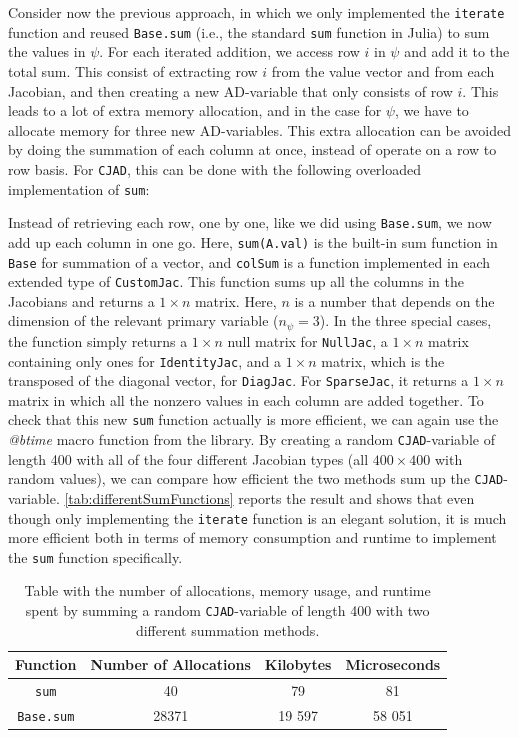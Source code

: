 Consider now the previous approach, in which we only implemented the \texttt{iterate} function and reused \texttt{Base.sum} (i.e., the standard \texttt{sum} function in Julia) to sum the values in $\psi$. For each iterated addition, we access row $i$ in $\psi$ and add it to the total sum. This consist of extracting row $i$ from the value vector and from each Jacobian, and then creating a new AD-variable that only consists of row $i$. This leads to a lot of extra memory allocation, and in the case for $\psi$, we have to allocate memory for three new AD-variables. This extra allocation can be avoided by doing the summation of each column at once, instead of operate on a row to row basis. For \texttt{CJAD}, this can be done with the following overloaded implementation of \texttt{sum}:

Instead of retrieving each row, one by one, like we did using \texttt{Base.sum}, we now add up each column in one go. Here, \texttt{sum(A.val)} is the built-in sum function in \texttt{Base} for summation of a vector, and \texttt{colSum} is a function implemented in each extended type of \texttt{CustomJac}. This function sums up all the columns in the Jacobians and returns a $1\times n$ matrix. Here, $n$ is a number that depends on the dimension of the relevant primary variable ($n_\psi = 3$). In the three special cases, the function simply returns a $1\times n$ null matrix for \texttt{NullJac}, a $1\times n$ matrix containing only ones for \texttt{IdentityJac}, and a $1\times n$ matrix, which is the transposed of the diagonal vector, for \texttt{DiagJac}.  For \texttt{SparseJac}, it returns a $1\times n$ matrix in which all the nonzero values in each column are added together. To check that this new \texttt{sum} function actually is more efficient, we can again use the \textit{@btime} macro function from the \emph{\cite{BenchmarkTools}} library. By creating a random \texttt{CJAD}-variable of length 400 with all of the four different Jacobian types (all $400\times 400$ with random values), we can compare how efficient the two methods sum up the \texttt{CJAD}-variable. \autoref{tab:differentSumFunctions} reports the  result and shows that even though only implementing the \texttt{iterate} function is an elegant solution, it is much more efficient both in terms of memory consumption and runtime to implement the \texttt{sum} function specifically.

\begin{table}[H]
    \centering
    \caption{Table with the number of allocations, memory usage, and runtime spent by summing a random \texttt{CJAD}-variable of length 400 with two different summation methods.}
    \label{tab:differentSumFunctions}
    \def\arraystretch{1.5}
    \begin{tabular}{cccc}
    \textbf{Function} & \textbf{Number of Allocations} & \textbf{Kilobytes} & \textbf{Microseconds} \\
        \hline
         \texttt{sum} & 40 & 79 & 81 \\  
         \texttt{Base.sum} & 28371 & 19 597 & 58 051\\ 
         \hline
    \end{tabular}
\end{table}

